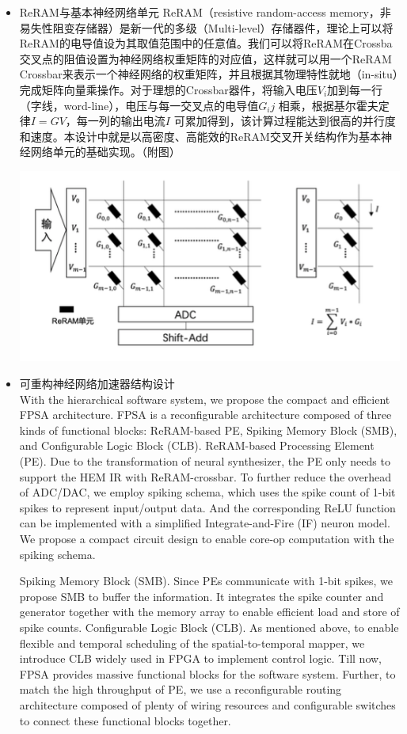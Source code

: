 \begin{itemize}
    \item ReRAM与基本神经网络单元
    ReRAM（resistive random-access memory，非易失性阻变存储器）是新一代的多级（Multi-level）存储器件，理论上可以将ReRAM的电导值设为其取值范围中的任意值。我们可以将ReRAM在Crossba交叉点的阻值设置为神经网络权重矩阵的对应值，这样就可以用一个ReRAM Crossbar来表示一个神经网络的权重矩阵，并且根据其物理特性就地（in-situ）完成矩阵向量乘操作。对于理想的Crossbar器件，将输入电压$V_i$加到每一行（字线，word-line），电压与每一交叉点的电导值$G_ij$ 相乘，根据基尔霍夫定律$I=GV$，每一列的输出电流$I$ 可累加得到，该计算过程能达到很高的并行度和速度。本设计中就是以高密度、高能效的ReRAM交叉开关结构作为基本神经网络单元的基础实现。（附图）
    
    \includegraphics[scale=0.6]{Img/Chap_Application/Zhang/ReRAM.png}
    
    \item 可重构神经网络加速器结构设计\\
    
    With the hierarchical software system, we propose the compact and efficient FPSA architecture. FPSA is a reconfigurable architecture composed of three kinds of functional blocks: ReRAM-based PE, Spiking Memory Block (SMB), and Configurable Logic Block (CLB). ReRAM-based Processing Element (PE). Due to the transformation of neural synthesizer, the PE only needs to support the HEM IR with ReRAM-crossbar. To further reduce the overhead of ADC/DAC, we employ spiking schema, which uses the spike count of 1-bit spikes to represent input/output data. And the corresponding ReLU function can be implemented with a simplified Integrate-and-Fire (IF) neuron model. We propose a compact circuit design to enable core-op computation with the spiking schema.
    
    Spiking Memory Block (SMB). Since PEs communicate with 1-bit spikes, we propose SMB to buffer the information. It integrates the spike counter and generator together with the memory array to enable efficient load and store of spike counts. Configurable Logic Block (CLB). As mentioned above, to enable flexible and temporal scheduling of the spatial-to-temporal mapper, we introduce CLB widely used in FPGA to implement control logic. Till now, FPSA provides massive functional blocks for the software system. Further, to match the high throughput of PE, we use a reconfigurable routing architecture composed of plenty of wiring resources and configurable switches to connect these functional blocks together.


\end{itemize}

